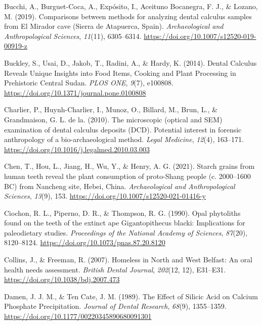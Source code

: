 \documentclass[
  letterpaper,
]{book}
\newlength{\cslhangindent}
\newlength{\cslentryspacingunit} %
\newenvironment{CSLReferences}[2] %
 {%
  \setlength{\parindent}{0pt}
  \ifodd #1
  \let\oldpar\par
  \def\par{\hangindent=\cslhangindent\oldpar}
  \fi
  \setlength{\parskip}{#2\cslentryspacingunit}
 }%
 {}
\begin{document}
\begin{CSLReferences}{1}{0}
\leavevmode{}%
Bucchi, A., Burguet-Coca, A., Expósito, I., Aceituno Bocanegra, F. J.,
\& Lozano, M. (2019). Comparisons between methods for analyzing dental
calculus samples from {El Mirador} cave ({Sierra} de {Atapuerca},
{Spain}). \emph{Archaeological and Anthropological Sciences},
\emph{11}(11), 6305--6314.
\url{https://doi.org/10.1007/s12520-019-00919-z}

\leavevmode{}%
Buckley, S., Usai, D., Jakob, T., Radini, A., \& Hardy, K. (2014).
Dental {Calculus Reveals Unique Insights} into {Food Items}, {Cooking}
and {Plant Processing} in {Prehistoric Central Sudan}. \emph{PLOS ONE},
\emph{9}(7), e100808. \url{https://doi.org/10.1371/journal.pone.0100808}

\leavevmode{}%
Charlier, P., Huynh-Charlier, I., Munoz, O., Billard, M., Brun, L., \&
Grandmaison, G. L. de la. (2010). The microscopic (optical and {SEM})
examination of dental calculus deposits ({DCD}). {Potential} interest in
forensic anthropology of a bio-archaeological method. \emph{Legal
Medicine}, \emph{12}(4), 163--171.
\url{https://doi.org/10.1016/j.legalmed.2010.03.003}

\leavevmode{}%
Chen, T., Hou, L., Jiang, H., Wu, Y., \& Henry, A. G. (2021). Starch
grains from human teeth reveal the plant consumption of proto-{Shang}
people (c. 2000--1600 {BC}) from {Nancheng} site, {Hebei}, {China}.
\emph{Archaeological and Anthropological Sciences}, \emph{13}(9), 153.
\url{https://doi.org/10.1007/s12520-021-01416-y}

\leavevmode{}%
Ciochon, R. L., Piperno, D. R., \& Thompson, R. G. (1990). Opal
phytoliths found on the teeth of the extinct ape {Gigantopithecus}
blacki: Implications for paleodietary studies. \emph{Proceedings of the
National Academy of Sciences}, \emph{87}(20), 8120--8124.
\url{https://doi.org/10.1073/pnas.87.20.8120}

\leavevmode{}%
Collins, J., \& Freeman, R. (2007). Homeless in {North} and {West
Belfast}: An oral health needs assessment. \emph{British Dental
Journal}, \emph{202}(12, 12), E31--E31.
\url{https://doi.org/10.1038/bdj.2007.473}

\leavevmode{}%
Damen, J. J. M., \& Ten Cate, J. M. (1989). The {Effect} of {Silicic
Acid} on {Calcium Phosphate Precipitation}. \emph{Journal of Dental
Research}, \emph{68}(9), 1355--1359.
\url{https://doi.org/10.1177/00220345890680091301}


\end{CSLReferences}
\end{document}
